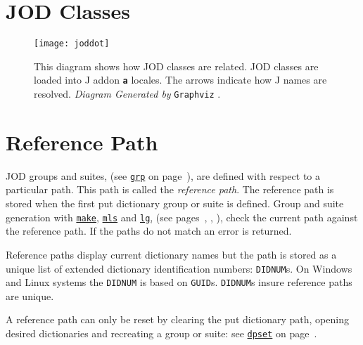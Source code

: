    \newpage
   \section{JOD Classes}\label{ap:classes}
   
   \begin{figure}[htbp]
  \centering
  \texttt{[image: joddot]}
  \caption[JOD Classes]{This diagram shows how 
    JOD classes are related. JOD classes are loaded into 
    J addon \textbf{\texttt{a}} locales. The arrows indicate how J names are resolved. \emph{Diagram Generated by} \texttt{Graphviz} \cite{jwiki:graphviz}.    
    }
   \label{eps:joddot}
   \end{figure}
   
   \newpage
   \section{Reference Path}\label{ap:refpath}
   
   JOD groups and suites, (see \hyperlink{il:grp}{\texttt{grp}} on page~\pageref{ss:grp}), are defined with respect to a particular path.  This path is called the \emph{reference path}.  The reference path is stored when the first put dictionary group or 
suite is defined.   Group and suite generation with \hyperlink{il:make}{\texttt{make}}, \hyperlink{il:mls}{\texttt{mls}} and  \hyperlink{il:lg}{\texttt{lg}}, (see pages~\pageref{ss:make}, \pageref{ss:mls}, \pageref{ss:lg}), check the current path against the reference path.  If the paths do not match an error is returned.

Reference paths display current dictionary names but the path is 
stored as a unique list of extended dictionary 
identification numbers: \texttt{DIDNUM}s.  On Windows and Linux 
systems the \texttt{DIDNUM} is based 
on \texttt{GUID}s.  \texttt{DIDNUM}s insure reference paths are unique.


A reference path can only be reset by clearing the put dictionary
 path, opening desired dictionaries and recreating a group or suite: see \hyperlink{il:dpset}{\texttt{dpset}} on page~\pageref{ss:dpset}.

